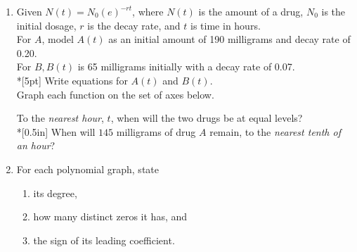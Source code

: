\documentclass[12pt, oneside]{article}
\begin{document}
\begin{enumerate}
\newpage

\item Given $N(t)=N_0(e)^{-rt}$, where $N(t)$ is the amount of a drug, $N_0$ is the initial dosage, $r$ is the decay rate, and $t$ is time in hours.\\[5pt] For $A$, model $A(t)$ as an initial amount of 190 milligrams and decay rate of 0.20.\\[5pt]
For $B, B(t)$ is 65 milligrams initially with a decay rate of 0.07.\\*[5pt]
Write equations for $A(t)$ and $B(t)$.\\[.75in]
Graph each function on the set of axes below.
\begin{center}
\end{center}
To the \emph{nearest hour}, $t$, when will the two drugs be at equal levels?\\*[0.5in]
When will $145$ milligrams of drug $A$ remain, to the \emph{nearest tenth of an hour}? 

\newpage

\item For each polynomial graph, state 
\begin{enumerate}
\item its degree,
\item how many distinct zeros it has, and
\item the sign of its leading coefficient.
\end{enumerate}


\end{enumerate}
\end{document}
